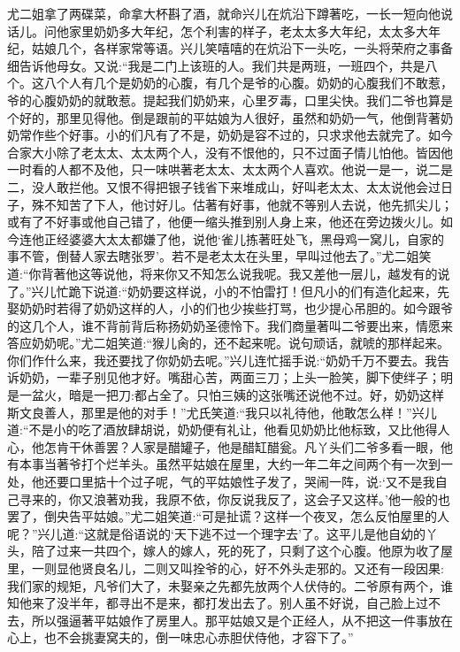 \begin{parag}
    尤二姐拿了两碟菜，命拿大杯斟了酒，就命兴儿在炕沿下蹲著吃，一长一短向他说话儿。问他家里奶奶多大年纪，怎个利害的样子，老太太多大年纪，太太多大年纪，姑娘几个，各样家常等语。兴儿笑嘻嘻的在炕沿下一头吃，一头将荣府之事备细告诉他母女。又说:“我是二门上该班的人。我们共是两班，一班四个，共是八个。这八个人有几个是奶奶的心腹，有几个是爷的心腹。奶奶的心腹我们不敢惹，爷的心腹奶奶的就敢惹。提起我们奶奶来，心里歹毒，口里尖快。我们二爷也算是个好的，那里见得他。倒是跟前的平姑娘为人很好，虽然和奶奶一气，他倒背著奶奶常作些个好事。小的们凡有了不是，奶奶是容不过的，只求求他去就完了。如今合家大小除了老太太、太太两个人，没有不恨他的，只不过面子情儿怕他。皆因他一时看的人都不及他，只一味哄著老太太、太太两个人喜欢。他说一是一，说二是二，没人敢拦他。又恨不得把银子钱省下来堆成山，好叫老太太、太太说他会过日子，殊不知苦了下人，他讨好儿。估著有好事，他就不等别人去说，他先抓尖儿；或有了不好事或他自己错了，他便一缩头推到别人身上来，他还在旁边拨火儿。如今连他正经婆婆大太太都嫌了他，说他‘雀儿拣著旺处飞，黑母鸡一窝儿，自家的事不管，倒替人家去瞎张罗’。若不是老太太在头里，早叫过他去了。”尤二姐笑道:“你背著他这等说他，将来你又不知怎么说我呢。我又差他一层儿，越发有的说了。”兴儿忙跪下说道:“奶奶要这样说，小的不怕雷打！但凡小的们有造化起来，先娶奶奶时若得了奶奶这样的人，小的们也少挨些打骂，也少提心吊胆的。如今跟爷的这几个人，谁不背前背后称扬奶奶圣德怜下。我们商量著叫二爷要出来，情愿来答应奶奶呢。”尤二姐笑道:“猴儿肏的，还不起来呢。说句顽话，就唬的那样起来。你们作什么来，我还要找了你奶奶去呢。”兴儿连忙摇手说:“奶奶千万不要去。我告诉奶奶，一辈子别见他才好。嘴甜心苦，两面三刀；上头一脸笑，脚下使绊子；明是一盆火，暗是一把刀:都占全了。只怕三姨的这张嘴还说他不过。好，奶奶这样斯文良善人，那里是他的对手！”尤氏笑道:“我只以礼待他，他敢怎么样！”兴儿道:“不是小的吃了酒放肆胡说，奶奶便有礼让，他看见奶奶比他标致，又比他得人心，他怎肯干休善罢？人家是醋罐子，他是醋缸醋瓮。凡丫头们二爷多看一眼，他有本事当著爷打个烂羊头。虽然平姑娘在屋里，大约一年二年之间两个有一次到一处，他还要口里掂十个过子呢，气的平姑娘性子发了，哭闹一阵，说:‘又不是我自己寻来的，你又浪著劝我，我原不依，你反说我反了，这会子又这样。’他一般的也罢了，倒央告平姑娘。”尤二姐笑道:“可是扯谎？这样一个夜叉，怎么反怕屋里的人呢？”兴儿道:“这就是俗语说的‘天下逃不过一个理字去’了。这平儿是他自幼的丫头，陪了过来一共四个，嫁人的嫁人，死的死了，只剩了这个心腹。他原为收了屋里，一则显他贤良名儿，二则又叫拴爷的心，好不外头走邪的。又还有一段因果:我们家的规矩，凡爷们大了，未娶亲之先都先放两个人伏侍的。二爷原有两个，谁知他来了没半年，都寻出不是来，都打发出去了。别人虽不好说，自己脸上过不去，所以强逼著平姑娘作了房里人。那平姑娘又是个正经人，从不把这一件事放在心上，也不会挑妻窝夫的，倒一味忠心赤胆伏侍他，才容下了。”
\end{parag}


